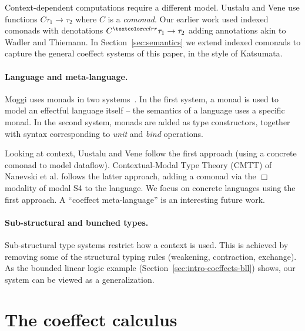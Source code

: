 Context-dependent computations require a different model. Uustalu and Vene \cite{uustalu2008notions} 
use functions $C{}{\tau_1} \rightarrow \tau_2$ where $C$ is a \emph{comonad}. Our earlier work 
\cite{petricek2013coeffects} used indexed comonads with denotations $C^{\cclrd{r}}{\tau_1} \rightarrow \tau_2$ adding 
annotations akin to Wadler and Thiemann. In Section~\ref{sec:semantics} we extend
indexed comonads to capture the general coeffect systems of this paper,  
in the style of Katsumata. 
% 
%

\paragraph{Language and meta-language.}
Moggi uses monads in two systems~\cite{moggi1991monads}. In the first system, a monad is used to model
an effectful language itself -- the semantics of a language uses a specific monad. In the second system, 
monads are added as type constructors, together with syntax corresponding to \emph{unit} and \emph{bind}
operations.

Looking at context, Uustalu and Vene \cite{uustalu2008notions} follow the first approach 
(using a concrete comonad to model dataflow). Contextual-Modal Type Theory (CMTT) of Nanevski et al.
\cite{logic-cmtt} follows the latter approach, adding a comonad via the $\Box$ modality of modal S4
to the language. We focus on concrete languages using the first approach. 
A ``coeffect meta-language'' is an interesting future work.

\paragraph{Sub-structural and bunched types.}
Sub-structural type systems restrict how a context is used. This is achieved by removing some
of the structural typing rules (weakening, contraction, exchange). As the bounded linear logic 
example (Section~\ref{sec:intro-coeffects-bll}) shows, our system can be viewed as a generalization.


\section{The coeffect calculus}
\label{sec:coeffects}

